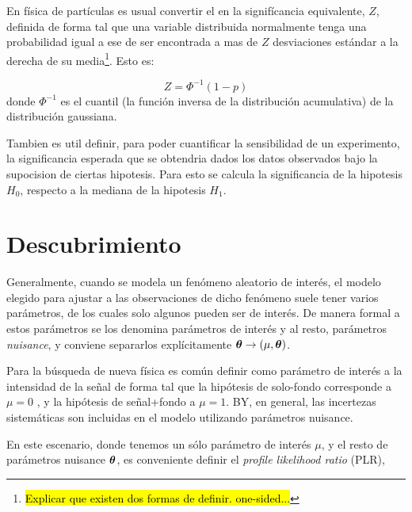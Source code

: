 En física de partículas es usual convertir el {\pvalue} en la signifícancia
equivalente, $Z$, definida de forma tal que una variable distribuida normalmente
tenga una probabilidad igual a ese {\pvalue} de ser encontrada a mas de $Z$
desviaciones estándar a la derecha de su media\footnote{\hl{Explicar que existen dos
  formas de definir. one-sided...}}. Esto es:

\begin{equation}
  Z = \Phi^{-1}(1-p)
\end{equation}
%
donde $\Phi^{-1}$ es el cuantil (la función inversa de la distribución
acumulativa) de la distribución gaussiana.

Tambien es util definir, para poder cuantificar la sensibilidad de un experimento,
la significancia esperada que se obtendria dados los datos observados bajo la
supocision de ciertas hipotesis.
Para esto se calcula la significancia de la hipotesis $H_0$, respecto
a la mediana de la hipotesis $H_1$.


\section{Descubrimiento}


Generalmente, cuando se modela un fenómeno aleatorio de interés, el modelo
elegido para ajustar a las observaciones de dicho fenómeno suele tener varios
parámetros, de los cuales solo algunos pueden ser de interés. De manera formal a
estos parámetros se los denomina parámetros de interés y al resto, parámetros
\emph{nuisance}, y conviene separarlos explícitamente $\bm{\theta} \rightarrow (\mu, \bm{\theta})$.

Para la búsqueda de nueva física es común definir como parámetro de interés a la
intensidad de la señal de forma tal que la hipótesis de solo-fondo corresponde a
$\mu = 0$ , y la hipótesis de señal+fondo a $\mu = 1$.
BY, en general, las incertezas sistemáticas son incluidas en el modelo
utilizando parámetros nuisance.

En este escenario, donde tenemos un sólo parámetro de interés
$\mu$, y el resto de parámetros nuisance $\bm{\theta}$, es conveniente
definir el \emph{profile likelihood ratio} (PLR),

